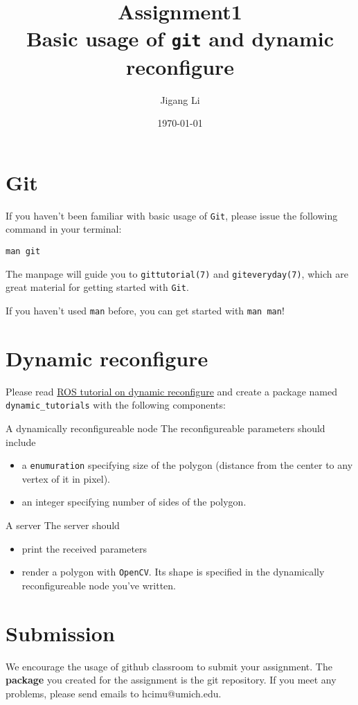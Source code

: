 \documentclass[a4paper]{article}
\author{Jigang Li}
\date{\today}
\title{Assignment1\\\medskip
\large Basic usage of \texttt{git} and dynamic reconfigure}
\begin{document}
\maketitle

\section{Git}
\label{sec:orgadf6835}

If you haven't been familiar with basic usage of \texttt{Git}, please issue the
following command in your terminal:

\begin{verbatim}
man git
\end{verbatim}

The manpage will guide you to \texttt{gittutorial(7)} and \texttt{giteveryday(7)}, which
are great material for getting started with \texttt{Git}.

If you haven't used \texttt{man} before, you can get started with \texttt{man man}!

\section{Dynamic reconfigure}
\label{sec:org348f938}

Please read  \href{http://wiki.ros.org/dynamic\_reconfigure/Tutorials}{ROS tutorial on dynamic reconfigure} and create a package
named \texttt{dynamic\_tutorials} with the following components:

\begin{component}{A dynamically reconfigureable node} {}
The reconfigureable parameters should include
\begin{itemize}
\item a \texttt{enumuration} specifying size of the polygon (distance from the
center to any vertex of it in pixel).
\item an integer specifying number of sides of the polygon.
\end{itemize}
\end{component}

\begin{component}{A server} {}
The server should
\begin{itemize}
\item print the received parameters
\item render a polygon with \texttt{OpenCV}. Its shape is specified in the
dynamically reconfigureable node you've written.
\end{itemize}
\end{component}

\section{Submission}
\label{sec:org6d5d073}

We encourage the usage of github classroom to submit your
assignment. The \textbf{package} you created for the assignment is the git
repository. If you meet any problems, please send emails to
hcimu@umich.edu.
\end{document}

